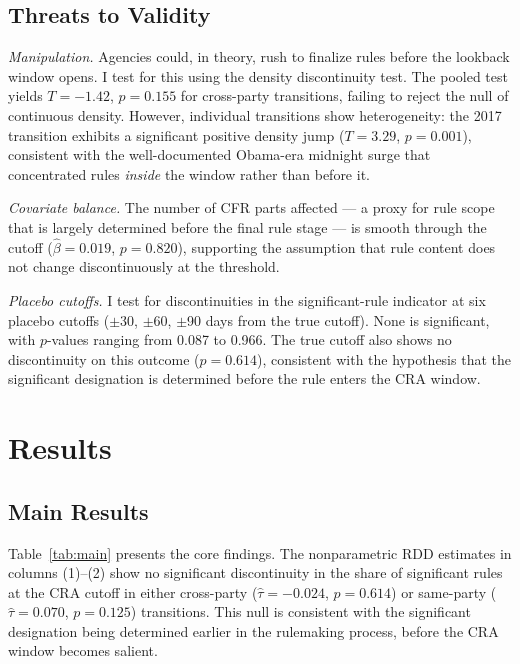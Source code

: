\documentclass[12pt]{article}
\begin{document}
\subsection{Threats to Validity}

\textit{Manipulation.} Agencies could, in theory, rush to finalize rules before the lookback window opens. I test for this using the \citet{cattaneo2020rdrobust} density discontinuity test. The pooled test yields $T = -1.42$, $p = 0.155$ for cross-party transitions, failing to reject the null of continuous density. However, individual transitions show heterogeneity: the 2017 transition exhibits a significant positive density jump ($T = 3.29$, $p = 0.001$), consistent with the well-documented Obama-era midnight surge that concentrated rules \textit{inside} the window rather than before it.

\textit{Covariate balance.} The number of CFR parts affected --- a proxy for rule scope that is largely determined before the final rule stage --- is smooth through the cutoff ($\hat{\beta} = 0.019$, $p = 0.820$), supporting the assumption that rule content does not change discontinuously at the threshold.

\textit{Placebo cutoffs.} I test for discontinuities in the significant-rule indicator at six placebo cutoffs ($\pm$30, $\pm$60, $\pm$90 days from the true cutoff). None is significant, with $p$-values ranging from 0.087 to 0.966. The true cutoff also shows no discontinuity on this outcome ($p = 0.614$), consistent with the hypothesis that the significant designation is determined before the rule enters the CRA window.


\section{Results}

\subsection{Main Results}



Table~\ref{tab:main} presents the core findings. The nonparametric RDD estimates in columns (1)--(2) show no significant discontinuity in the share of significant rules at the CRA cutoff in either cross-party ($\hat{\tau} = -0.024$, $p = 0.614$) or same-party ($\hat{\tau} = 0.070$, $p = 0.125$) transitions. This null is consistent with the significant designation being determined earlier in the rulemaking process, before the CRA window becomes salient.
\end{document}
